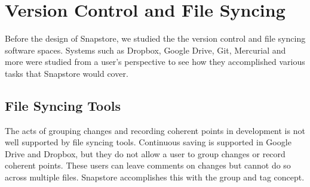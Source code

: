 



\section{Version Control and File Syncing}

Before the design of Snapstore, we studied the the version control and file syncing software spaces. Systems such as Dropbox, Google Drive, Git, Mercurial and more were studied from a user's perspective to see how they accomplished various tasks that Snapstore would cover.

\subsection{File Syncing Tools}

The acts of grouping changes and recording coherent points in development is not well supported by file syncing tools. Continuous saving is supported in Google Drive and Dropbox, but they do not allow a user to group changes or record coherent points. These users can leave comments on changes but cannot do so across multiple files. Snapstore accomplishes this with the group and tag concept.

